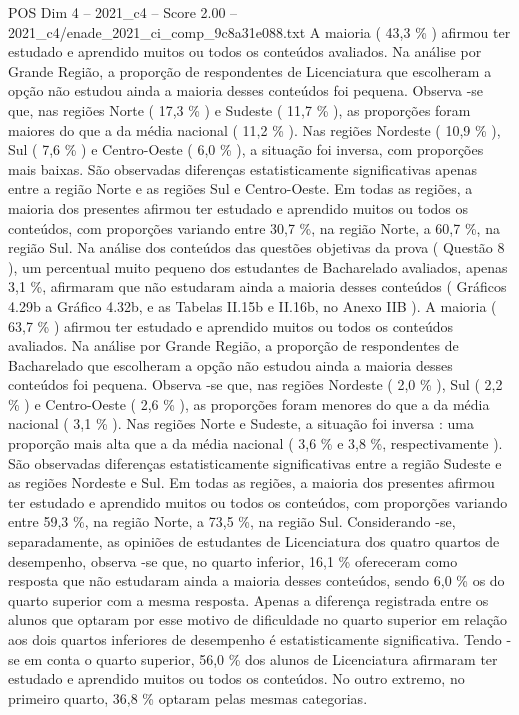 \begin{textsample}{POS Dim 4 – 2021\_c4 – Score 2.00 – 2021\_c4/enade\_2021\_ci\_comp\_9c8a31e088.txt}
A maioria ( 43,3 \% ) afirmou ter estudado e aprendido muitos ou todos os conteúdos avaliados.
Na análise por Grande Região, a proporção de respondentes de Licenciatura que escolheram a opção não estudou ainda a maioria desses conteúdos foi pequena.
Observa -se que, nas regiões Norte ( 17,3 \% ) e Sudeste ( 11,7 \% ), as proporções foram maiores do que a da média nacional ( 11,2 \% ).
Nas regiões Nordeste ( 10,9 \% ), Sul ( 7,6 \% ) e Centro-Oeste ( 6,0 \% ), a situação foi inversa, com proporções mais baixas.
São observadas diferenças estatisticamente significativas apenas entre a região Norte e as regiões Sul e Centro-Oeste.
Em todas as regiões, a maioria dos presentes afirmou ter estudado e aprendido muitos ou todos os conteúdos, com proporções variando entre 30,7 \%, na região Norte, a 60,7 \%, na região Sul.
Na análise dos conteúdos das questões objetivas da prova ( Questão 8 ), um percentual muito pequeno dos estudantes de Bacharelado avaliados, apenas 3,1 \%, afirmaram que não estudaram ainda a maioria desses conteúdos ( Gráficos 4.29b a Gráfico 4.32b, e as Tabelas II.15b e II.16b, no Anexo IIB ).
A maioria ( 63,7 \% ) afirmou ter estudado e aprendido muitos ou todos os conteúdos avaliados.
Na análise por Grande Região, a proporção de respondentes de Bacharelado que escolheram a opção não estudou ainda a maioria desses conteúdos foi pequena.
Observa -se que, nas regiões Nordeste ( 2,0 \% ), Sul ( 2,2 \% ) e Centro-Oeste ( 2,6 \% ), as proporções foram menores do que a da média nacional ( 3,1 \% ).
Nas regiões Norte e Sudeste, a situação foi inversa : uma proporção mais alta que a da média nacional ( 3,6 \% e 3,8 \%, respectivamente ).
São observadas diferenças estatisticamente significativas entre a região Sudeste e as regiões Nordeste e Sul.
Em todas as regiões, a maioria dos presentes afirmou ter estudado e aprendido muitos ou todos os conteúdos, com proporções variando entre 59,3 \%, na região Norte, a 73,5 \%, na região Sul.
Considerando -se, separadamente, as opiniões de estudantes de Licenciatura dos quatro quartos de desempenho, observa -se que, no quarto inferior, 16,1 \% ofereceram como resposta que não estudaram ainda a maioria desses conteúdos, sendo 6,0 \% os do quarto superior com a mesma resposta.
Apenas a diferença registrada entre os alunos que optaram por esse motivo de dificuldade no quarto superior em relação aos dois quartos inferiores de desempenho é estatisticamente significativa.
Tendo -se em conta o quarto superior, 56,0 \% dos alunos de Licenciatura afirmaram ter estudado e aprendido muitos ou todos os conteúdos.
No outro extremo, no primeiro quarto, 36,8 \% optaram pelas mesmas categorias.

\end{textsample}
